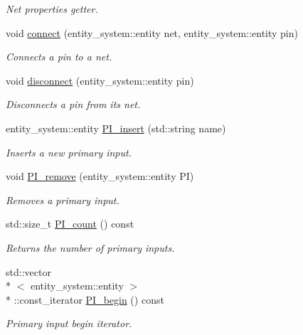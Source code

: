 \begin{DoxyCompactItemize}
\begin{DoxyCompactList}\small\item\em Net properties getter. \end{DoxyCompactList}\item 
void \hyperlink{classophidian_1_1netlist_1_1netlist_af0f040e3fa3f7de8993bb681fc5c86d3}{connect} (entity\-\_\-system\-::entity net, entity\-\_\-system\-::entity pin)
\begin{DoxyCompactList}\small\item\em Connects a pin to a net. \end{DoxyCompactList}\item 
void \hyperlink{classophidian_1_1netlist_1_1netlist_a04881b276dd896e182edd32671807123}{disconnect} (entity\-\_\-system\-::entity pin)
\begin{DoxyCompactList}\small\item\em Disconnects a pin from its net. \end{DoxyCompactList}\item 
entity\-\_\-system\-::entity \hyperlink{classophidian_1_1netlist_1_1netlist_a8597c78d00d87dc30aad46b4e85285fc}{P\-I\-\_\-insert} (std\-::string name)
\begin{DoxyCompactList}\small\item\em Inserts a new primary input. \end{DoxyCompactList}\item 
void \hyperlink{classophidian_1_1netlist_1_1netlist_ae984f3e17045293c6e0213a71031c6f8}{P\-I\-\_\-remove} (entity\-\_\-system\-::entity P\-I)
\begin{DoxyCompactList}\small\item\em Removes a primary input. \end{DoxyCompactList}\item 
std\-::size\-\_\-t \hyperlink{classophidian_1_1netlist_1_1netlist_a4b3b3780c9aa759e4838faa0465e12dc}{P\-I\-\_\-count} () const 
\begin{DoxyCompactList}\small\item\em Returns the number of primary inputs. \end{DoxyCompactList}\item 
std\-::vector\\*
$<$ entity\-\_\-system\-::entity $>$\\*
\-::const\-\_\-iterator \hyperlink{classophidian_1_1netlist_1_1netlist_afa9990f7471492e67e0531ca7ed67a13}{P\-I\-\_\-begin} () const 
\begin{DoxyCompactList}\small\item\em Primary input begin iterator. \end{DoxyCompactList}\item 

\end{DoxyCompactItemize}
